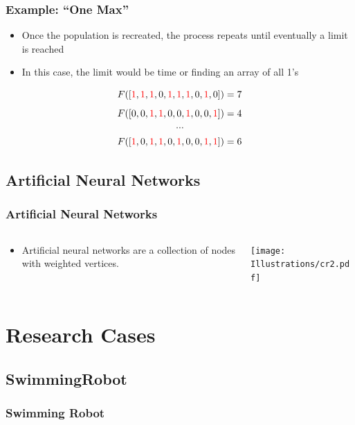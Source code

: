 \documentclass{beamer}
\begin{document}
\begin{frame}
  \frametitle{Example: ``One Max''}
\begin{itemize}
  \item Once the population is recreated, the process repeats until eventually a limit is reached
  \item In this case, the limit would be time or finding an array of all 1's
\end{itemize}
\[
F([ \textcolor{red}{1},  \textcolor{red}{1}, \textcolor{red}{1}, 0, \textcolor{red}{1}, \textcolor{red}{1}, \textcolor{red}{1}, 0, \textcolor{red}{1}, 0 ]) = 7
\]
\[F([  0, 0, \textcolor{red}{1}, \textcolor{red}{1}, 0,  0, \textcolor{red}{1}, 0, 0, \textcolor{red}{1} ]) = 4
\]
\[\cdots\]
\[F([  \textcolor{red}{1}, 0, \textcolor{red}{1}, \textcolor{red}{1}, 0,  \textcolor{red}{1}, 0, 0, \textcolor{red}{1}, \textcolor{red}{1} ]) = 6
\]
\end{frame}

\subsection{Artificial Neural Networks}
\begin{frame}
  \frametitle{Artificial Neural Networks}
\begin{columns}
  \begin{column}{0.5\textwidth}
\begin{itemize}
\item Artificial neural networks are a collection of nodes with weighted vertices.
\end{itemize}
\end{column}
\begin{column}{0.5\textwidth}
 \texttt{[image: Illustrations/cr2.pdf]}
       \\
\end{column}
\end{columns}
\end{frame}

\section{Research Cases}

\subsection{SwimmingRobot}
\begin{frame}
  \frametitle{Swimming Robot}
\end{frame}
\end{document}
